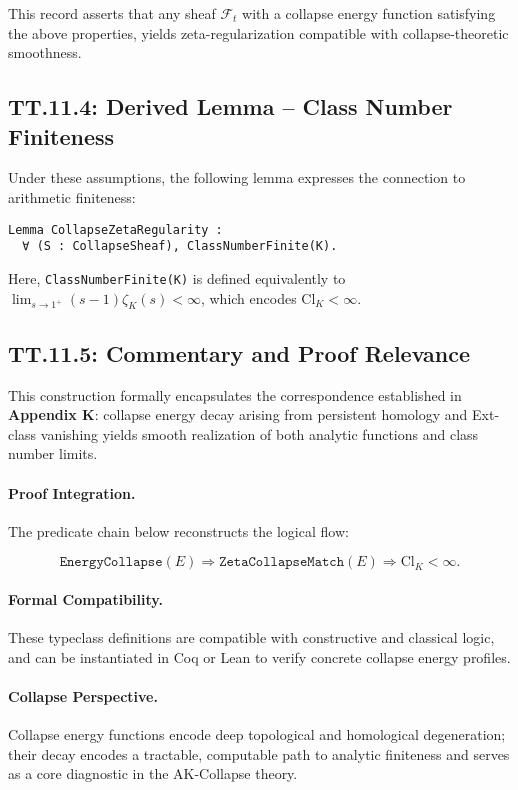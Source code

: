 \documentclass[11pt]{article}
\begin{document}
{This record asserts that any sheaf \( \mathcal{F}_t \) with a collapse energy function  
satisfying the above properties, yields zeta-regularization compatible with collapse-theoretic smoothness.

\subsection*{TT.11.4: Derived Lemma – Class Number Finiteness}

Under these assumptions, the following lemma expresses the connection to arithmetic finiteness:

\begin{verbatim}
Lemma CollapseZetaRegularity :
  ∀ (S : CollapseSheaf), ClassNumberFinite(K).
\end{verbatim}

Here, \texttt{ClassNumberFinite(K)} is defined equivalently to  
\( \lim_{s \to 1^+} (s - 1)\zeta_K(s) < ∞ \), which encodes \( \mathrm{Cl}_K < ∞ \).

\subsection*{TT.11.5: Commentary and Proof Relevance}

This construction formally encapsulates the correspondence established in \textbf{Appendix K}:  
collapse energy decay arising from persistent homology and Ext-class vanishing  
yields smooth realization of both analytic functions and class number limits.

\paragraph{Proof Integration.}
The predicate chain below reconstructs the logical flow:

\[
\texttt{EnergyCollapse}(E) \Rightarrow \texttt{ZetaCollapseMatch}(E) \Rightarrow \mathrm{Cl}_K < \infty.
\]

\paragraph{Formal Compatibility.}
These typeclass definitions are compatible with constructive and classical logic,  
and can be instantiated in Coq or Lean to verify concrete collapse energy profiles.

\paragraph{Collapse Perspective.}
Collapse energy functions encode deep topological and homological degeneration;  
their decay encodes a tractable, computable path to analytic finiteness and  
serves as a core diagnostic in the AK-Collapse theory.

}
\end{document}
